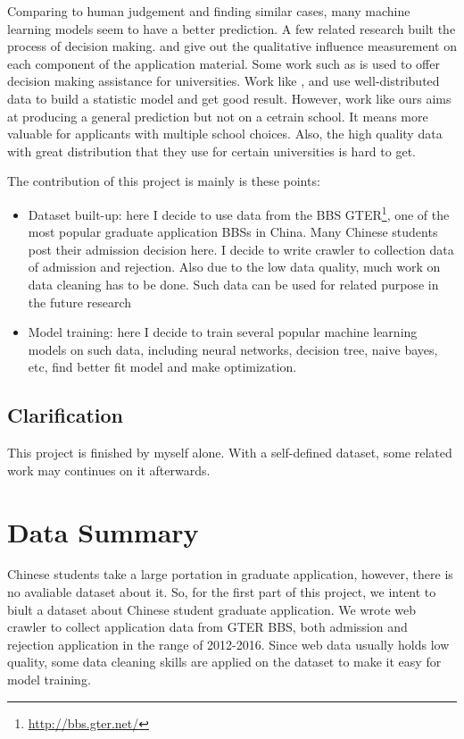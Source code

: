 \documentclass{article}
\begin{document}
Comparing to human judgement and finding similar cases, many machine learning models seem to have a better prediction. A few related research built the process of decision making. \cite{raghunathan2010demystifying} and \cite{alzahranigot} give out the qualitative influence measurement on each component of the application material. Some work such as \cite{waters2014grade} is used to offer decision making assistance for universities. Work like \cite{bruggink1996statistical}, \cite{moore1998expert} and \cite{gupta2016will} use well-distributed data to build a statistic model and get good result. However, work like ours aims at producing a general prediction but not on a cetrain school. It means more valuable for applicants with multiple school choices. Also, the high quality data with great distribution that they use for certain universities is hard to get.

The contribution of this project is mainly is these points:

\begin{itemize}
    \item Dataset built-up: here I decide to use data from the BBS GTER\footnote{\url{http://bbs.gter.net/}}, one of the most popular graduate application BBSs in China. Many Chinese students post their admission decision here. I decide to write crawler to collection data of admission and rejection. Also due to the low data quality, much work on data cleaning has to be done. Such data can be used for related purpose in the future research\\
    \item Model training: here I decide to train several popular machine learning models on such data, including neural networks, decision tree, naive bayes, etc, find better fit model and make optimization.\\
\end{itemize}

\subsection*{Clarification}

This project is finished by myself alone. With a self-defined dataset, some related work may continues on it afterwards.

\section{Data Summary}

Chinese students take a large portation in graduate application, however, there is no avaliable dataset about it. So, for the first part of this project, we intent to biult a dataset about Chinese student graduate application. We wrote web crawler to collect application data from GTER BBS, both admission and rejection application in the range of 2012-2016. Since web data usually holds low quality, some data cleaning skills are applied on the dataset to make it easy for model training.
\end{document}
